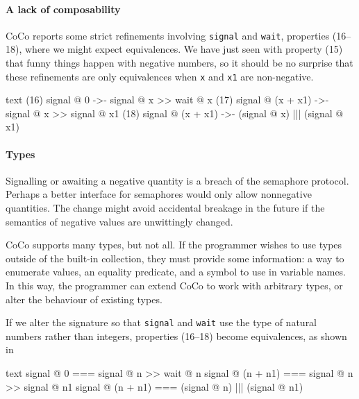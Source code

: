 \paragraph{A lack of composability}
CoCo reports some strict refinements involving \verb|signal| and
\verb|wait|, properties (16--18), where we might expect equivalences.
We have just seen with property (15) that funny things happen with
negative numbers, so it should be no surprise that these refinements
are only equivalences when \verb|x| and \verb|x1| are non-negative.

\begin{listing}
\centering
\begin{cminted}{text}
(16)         signal @ 0  ->-  signal @ x >> wait @ x
(17)  signal @ (x + x1)  ->-  signal @ x >> signal @ x1
(18)  signal @ (x + x1)  ->-  (signal @ x) ||| (signal @ x1)
\end{cminted}
\caption{Properties suggesting a lack of composability.}\label{lst:sem3}
\end{listing}

\paragraph{Types}
Signalling or awaiting a negative quantity is a breach of the
semaphore protocol.  Perhaps a better interface for semaphores would
only allow nonnegative quantities.  The change might avoid accidental
breakage in the future if the semantics of negative values are
unwittingly changed.

CoCo supports many types, but not all.  If the programmer wishes to
use types outside of the built-in collection, they must provide some
information: a way to enumerate values, an equality predicate, and a
symbol to use in variable names.  In this way, the programmer can
extend CoCo to work with arbitrary types, or alter the behaviour of
existing types.

If we alter the signature so that \verb|signal| and \verb|wait| use
the type of natural numbers rather than integers, properties (16--18)
become equivalences, as shown in 

\begin{listing}
\centering
\begin{cminted}{text}
       signal @ 0  ===  signal @ n >> wait @ n
signal @ (n + n1)  ===  signal @ n >> signal @ n1
signal @ (n + n1)  ===  (signal @ n) ||| (signal @ n1)
\end{cminted}
\caption{Properties (16--18) restricted to natural numbers.}\label{lst:sem4}
\end{listing}

